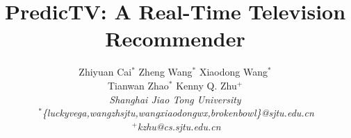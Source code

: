 \documentclass[conference,letterpaper]{sig-alternate}
\newcommand{\tab}{\hspace*{2ex}}
\begin{document}
\title{PredicTV: A Real-Time Television Recommender}

\author{
Zhiyuan Cai$^*$ \tab Zheng Wang$^*$ \tab Xiaodong Wang$^*$ \\
Tianwan Zhao$^*$ \tab Kenny Q. Zhu$^{+}$
\vspace{1.6mm}\\
\fontsize{10}{10}\selectfont\itshape
Shanghai Jiao Tong University\\
\fontsize{10}{10}\selectfont\ttfamily\upshape
$~^{*}$\{luckyvega,wangzhsjtu,wangxiaodongwx,brokenbowl\}@sjtu.edu.cn\\
\fontsize{10}{10}\selectfont\ttfamily\upshape
$~^{+}$kzhu@cs.sjtu.edu.cn
}
%
\maketitle
%
\end{document}
